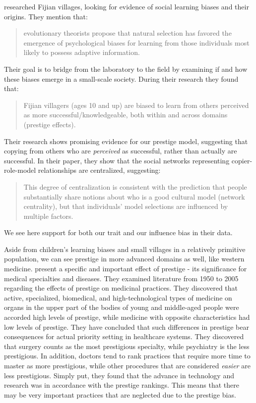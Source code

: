 \documentclass[12pt]{extarticle}
\begin{document}
\citet{fijian_social_bias} researched Fijian villages, looking for evidence of social learning biases and their origins. They mention that:
\begin{quote}
evolutionary theorists propose that natural selection has favored the emergence of psychological biases for learning from those individuals most likely to possess adaptive information.
\end{quote}
Their goal is to bridge from the laboratory to the field by examining if and how these biases emerge in a small-scale society.
During their research they found that:
\begin{quote}
Fijian villagers (ages 10 and up) are biased to learn from others perceived as more successful/knowledgeable, both within and across domains (prestige effects).
\end{quote}
Their research shows promising evidence for our prestige model, suggesting that copying from others who are \textit{perceived} as successful, rather than actually are successful. In their paper, they show that the social networks representing copier-role-model relationships are centralized, suggesting:
\begin{quote}
This degree of centralization is consistent with the prediction that people substantially share notions about who is a good cultural model (network centrality), but that individuals’ model selections are influenced by multiple factors.
\end{quote}
We see here support for both our trait and our influence bias in their data.

Aside from children's learning biases and small villages in a relatively primitive population, we can see prestige in more advanced domains as well, like western medicine.\citet{medical_prestige} present a specific and important effect of prestige - its significance for medical specialties and diseases.
They examined literature from 1950 to 2005 regarding the effects of prestige on medicinal practices. They discovered that active, specialized, biomedical, and high-technological types of medicine on organs in the upper part of the bodies of young and middle-aged people were accorded high levels of prestige, while medicine with opposite characteristics had low levels of prestige. They have concluded that such differences in prestige bear consequences for actual priority setting in healthcare systems. They discovered that surgery counts as the most prestigious specialty, while psychiatry is the less prestigious. In addition, doctors tend to rank practices that require more time to master as more prestigious, while other procedures that are considered \textit{easier} are less prestigious. Simply put, they found that the advance in technology and research was in accordance with the prestige rankings.
This means that there may be very important practices that are neglected due to the prestige bias.
\end{document}
